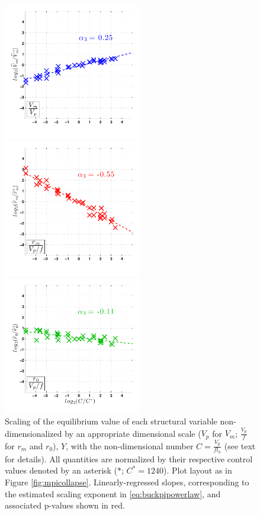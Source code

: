 \documentclass[12pt]{article}
\begin{document}
\begin{figure}[h!]
\centering
  \noindent\includegraphics[width=6cm,height=6cm]{FIGURES_TC_RCE_equilibrium_v2.0/Fig7a_Nondimensional_scaling_V.pdf}
  
  \noindent\includegraphics[width=6cm,height=6cm]{FIGURES_TC_RCE_equilibrium_v2.0/Fig7b_Nondimensional_scaling_rm.pdf}
  
  \noindent\includegraphics[width=6cm,height=6cm]{FIGURES_TC_RCE_equilibrium_v2.0/Fig7c_Nondimensional_scaling_r0.pdf}

\caption{Scaling of the equilibrium value of each structural variable non-dimensionalized by an appropriate dimensional scale ($V_p$ for $V_m$; $\frac{V_p}{f}$ for $r_m$ and $r_0$), $Y$, with the non-dimensional number $C = \frac{V_p}{fl_h}$ (see text for details). All quantities are normalized by their respective control values denoted by an asterisk ($*$; $C^* = 1240$). Plot layout as in Figure \ref{fig:mpicollapse}.  Linearly-regressed slopes, corresponding to the estimated scaling exponent in \eqref{eq:buckpipowerlaw}, and associated p-values shown in red.}
\label{fig:nondimscaling}
\end{figure}
\end{document}
